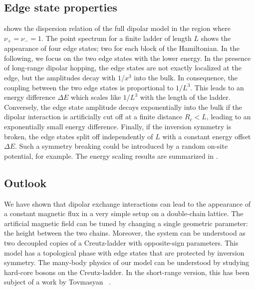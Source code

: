 \subsection{Edge state properties}


 shows the dispersion relation of the full dipolar model in the region where $\nu_+ = \nu_- = 1$.
The point spectrum for a finite ladder of length $L$ shows the appearance of four edge states; two for each block of the Hamiltonian.
In the following, we focus on the two edge states with the lower energy.
In the presence of long-range dipolar hopping, the edge states are not exactly localized at the edge, but the amplitudes decay with $1/x^3$ into the bulk.
In consequence, the coupling between the two edge states is proportional to $1/L^3$.
This leads to an energy difference $\Delta E$ which scales like $1/L^3$ with the length of the ladder.
Conversely, the edge state amplitude decays exponentially into the bulk if the dipolar interaction is artificially cut off at a finite distance $R_c < L$, leading to an exponentially small energy difference.
Finally, if the inversion symmetry is broken, the edge states split off independently of $L$ with a constant energy offset $\Delta E$.
Such a symmetry breaking could be introduced by a random on-site potential, for example.
The energy scaling results are summarized in .

\subsection{Outlook}
We have shown that dipolar exchange interactions can lead to the appearance of a constant magnetic flux in a very simple setup on a double-chain lattice.
The artificial magnetic field can be tuned by changing a single geometric parameter: the height between the two chains.
Moreover, the system can be understood as two decoupled copies of a Creutz-ladder with opposite-sign parameters.
This model has a topological phase with edge states that are protected by inversion symmetry.
The many-body physics of our model can be understood by studying hard-core bosons on the Creutz-ladder.
In the short-range version, this has been subject of a work by Tovmasyan \etal~\cite{Tovmasyan2013a}.
